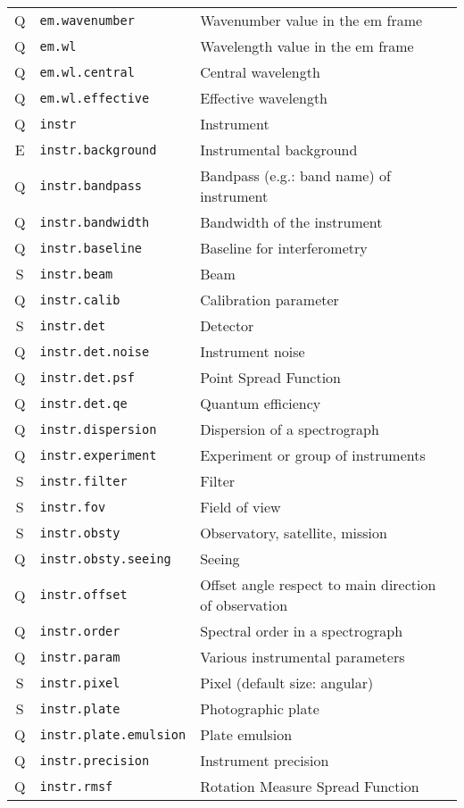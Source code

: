 \documentclass[11pt,a4paper]{ivoa}
\begin{document}
\begin{longtable}[h!]{c|p{40ex}|p{}}
Q & {\tt em.wavenumber} & Wavenumber value in the em frame\\
Q & {\tt em.wl} & Wavelength value in the em frame\\
Q & {\tt em.wl.central} & Central wavelength\\
Q & {\tt em.wl.effective} & Effective wavelength\\
Q & {\tt instr} & Instrument\\
E & {\tt instr.background} & Instrumental background\\
Q & {\tt instr.bandpass} & Bandpass (e.g.: band name) of instrument\\
Q & {\tt instr.bandwidth} & Bandwidth of the instrument\\
Q & {\tt instr.baseline} & Baseline for interferometry\\
S & {\tt instr.beam} & Beam\\
Q & {\tt instr.calib} & Calibration parameter\\
S & {\tt instr.det} & Detector\\
Q & {\tt instr.det.noise} & Instrument noise\\
Q & {\tt instr.det.psf} & Point Spread Function\\
Q & {\tt instr.det.qe} & Quantum efficiency\\
Q & {\tt instr.dispersion} & Dispersion of a spectrograph\\
Q & {\tt instr.experiment} & Experiment or group of instruments\\
S & {\tt instr.filter} & Filter\\
S & {\tt instr.fov} & Field of view\\
S & {\tt instr.obsty} & Observatory, satellite, mission\\
Q & {\tt instr.obsty.seeing} & Seeing\\
Q & {\tt instr.offset} & Offset angle respect to main direction of observation\\
Q & {\tt instr.order} & Spectral order in a spectrograph\\
Q & {\tt instr.param} & Various instrumental parameters\\
S & {\tt instr.pixel} & Pixel (default size: angular)\\
S & {\tt instr.plate} & Photographic plate\\
Q & {\tt instr.plate.emulsion} & Plate emulsion\\
Q & {\tt instr.precision} & Instrument precision\\
Q & {\tt instr.rmsf} & Rotation Measure Spread Function\\

\end{longtable}
\end{document}

